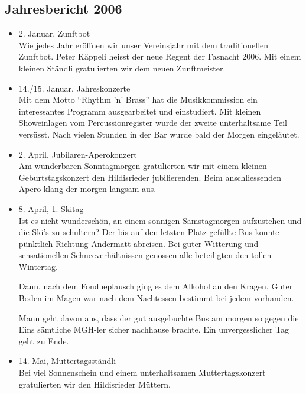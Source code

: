 \subsection{Jahresbericht 2006}

\begin{history}


    \begin{itemize}

        \item[]2. Januar, Zunftbot\\
        Wie jedes Jahr eröffnen wir unser Vereinsjahr mit dem traditionellen
        Zunftbot. Peter Käppeli heisst der neue Regent der Fasnacht 2006. Mit
        einem kleinen Ständli gratulierten wir dem neuen Zunftmeister.

        \item[]14./15. Januar, Jahreskonzerte\\
        Mit dem Motto \enquote{Rhythm 'n’ Brass} hat die Musikkommission ein
        interessantes Programm ausgearbeitet und einstudiert. Mit kleinen
        Showeinlagen vom Percussionregister wurde der zweite unterhaltsame Teil
        versüsst. Nach vielen Stunden in der Bar wurde bald der Morgen
        eingeläutet.

        \item[]2. April, Jubilaren-Aperokonzert\\
        Am wunderbaren Sonntagmorgen gratulierten wir mit einem kleinen
        Geburtstagskonzert den Hildisrieder jubilierenden. Beim anschliessenden
        Apero klang der morgen langsam aus.

        \item[]8. April, 1. Skitag\\
        Ist es nicht wunderschön, an einem sonnigen Samstagmorgen aufzustehen
        und die Ski's zu schultern? Der bis auf den letzten Platz gefüllte Bus
        konnte pünktlich Richtung Andermatt abreisen. Bei guter Witterung und
        sensationellen Schneeverhältnissen genossen alle beteiligten den tollen
        Wintertag.

        Dann, nach dem Fondueplausch ging es dem Alkohol an den Kragen. Guter
        Boden im Magen war nach dem Nachtessen bestimmt bei jedem vorhanden.

        Mann geht davon aus, dass der gut ausgebuchte Bus am morgen so gegen die
        Eins sämtliche MGH-ler sicher nachhause brachte. Ein unvergesslicher Tag
        geht zu Ende.

        \item[]14. Mai, Muttertagsständli\\
        Bei viel Sonnenschein und einem unterhaltsamen Muttertagskonzert
        gratulierten wir den Hildisrieder Müttern.


\end{itemize}
\end{history}
